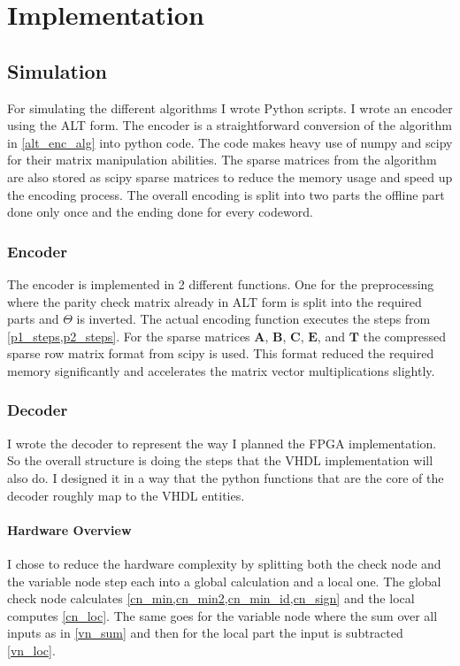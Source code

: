
\chapter{Implementation}


\section{Simulation}
For simulating the different algorithms I wrote Python scripts. I wrote an encoder using the ALT form. The encoder is a straightforward conversion of the algorithm in \cref{alt_enc_alg} into python code. The code makes heavy use of numpy and scipy for their matrix manipulation abilities. The sparse matrices from the algorithm are also stored as scipy sparse matrices to reduce the memory usage and speed up the encoding process. The overall encoding is split into two parts the offline part done only once and the ending done for every codeword. 

\subsection{Encoder}
The encoder is implemented in 2 different functions. One for the preprocessing where the parity check matrix already in ALT form is split into the required parts and $\Theta$ is inverted. The actual encoding function executes the steps from \cref{p1_steps,p2_steps}. For the sparse matrices $\bm{A}$, $\bm{B}$, $\bm{C}$, $\bm{E}$, and $\bm{T}$ the compressed sparse row matrix format from scipy is used. This format reduced the required memory significantly and accelerates the matrix vector multiplications slightly. 

\subsection{Decoder}
I wrote the decoder to represent the way I planned the FPGA implementation. So the overall structure is doing the steps that the VHDL implementation will also do. I designed it in a way that the python functions that are the core of the decoder roughly map to the VHDL entities. 

\subsubsection{Hardware Overview}
I chose to reduce the hardware complexity by splitting both the check node and the variable node step each into a global calculation and a local one. The global check node calculates \cref{cn_min,cn_min2,cn_min_id,cn_sign} and the local computes \cref{cn_loc}. The same goes for the variable node where the sum over all inputs as in \cref{vn_sum} and then for the local part the input is subtracted \cref{vn_loc}.

